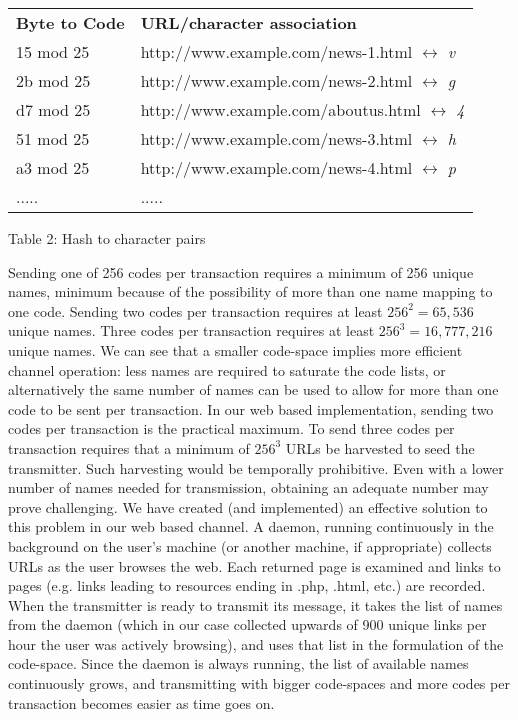 \documentclass[10pt, conference]{IEEEtran}
\begin{document}
\begin{table*}[ht]
 \centering
  \begin{tabular}{| l | l | }
    \hline
    {\bf Byte to Code} & {\bf URL/character association}\\
    15 mod 25 & http://www.example.com/news-1.html $\leftrightarrow$ {\em v} \\
    2b mod 25 & http://www.example.com/news-2.html $\leftrightarrow$ {\em g} \\
    d7 mod 25 & http://www.example.com/aboutus.html $\leftrightarrow$ {\em 4} \\
    51 mod 25 & http://www.example.com/news-3.html $\leftrightarrow$ {\em h} \\
    a3 mod 25 & http://www.example.com/news-4.html $\leftrightarrow$ {\em p} \\
    ..... & .....\\
    \hline
  \end{tabular}
  \begin{center} Table 2: Hash to character pairs\end{center}
\end{table*}

Sending one of 256 codes per transaction requires a minimum of 256 unique names, minimum because of the possibility of more than one name mapping to one code.  
Sending two codes per transaction requires at least $256^2 = 65,536$ unique names.   Three codes per transaction requires at least $256^3 = 16,777,216$ unique names.
We can see that a smaller code-space implies more efficient channel operation: less names are required to saturate the code lists, or alternatively the same number of names can be used to allow for more than one code to be sent per transaction.  In our web based  implementation, sending two codes per transaction is the practical maximum.  To send three codes per transaction requires that a minimum of $256^3$ URLs be harvested to seed the transmitter.  Such harvesting would be temporally prohibitive.  Even with a lower number of names needed for transmission, obtaining an adequate number may prove challenging.  We have created (and implemented) an effective solution to this problem in our web based channel.  A daemon, running continuously in the background on the user's machine (or another machine, if appropriate) collects URLs as the user browses the web.  Each returned page is examined and links to pages (e.g. links leading to resources ending in .php, .html, etc.) are recorded.  When the transmitter is ready to transmit its message, it takes the list of names from the daemon (which in our case collected upwards of 900 unique links per hour the user was actively browsing), and uses that list in the formulation of the code-space.  Since the daemon is always running, the list of available names continuously grows, and transmitting with bigger code-spaces and more codes per transaction becomes easier as time goes on.
\end{document}
